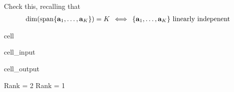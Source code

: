 \documentclass[letterpaper,10pt,english]{jupyterBook}
\begin{document}
\sphinxAtStartPar
{} Check this, recalling that
\begin{equation*}
\begin{split}
%
\dim(\mathrm{span}\{{\bf a}_1, \ldots, {\bf a}_K\}) = K
\, \iff \,
\{{\bf a}_1, \ldots, {\bf a}_K\} \text{ linearly indepenent}
%
\end{split}
\end{equation*}
\begin{sphinxuseclass}{cell}\begin{sphinxVerbatimInput}

\begin{sphinxuseclass}{cell_input}
\begin{sphinxVerbatim}[commandchars=\\\{\}]
   
  \PYG{p}{[}\PYG{p}{[} \PYG{p}{]}
     \PYG{p}{[} \PYG{p}{]}\PYG{p}{]}
  \PYG{p}{[}\PYG{p}{[} \PYG{p}{]}
     \PYG{p}{[} \PYG{p}{]}\PYG{p}{]}
\end{sphinxVerbatim}

\end{sphinxuseclass}\end{sphinxVerbatimInput}
\begin{sphinxVerbatimOutput}

\begin{sphinxuseclass}{cell_output}
\begin{sphinxVerbatim}[commandchars=\\\{\}]
Rank = 2
Rank = 1
\end{sphinxVerbatim}

\end{sphinxuseclass}\end{sphinxVerbatimOutput}

\end{sphinxuseclass}
\end{document}
